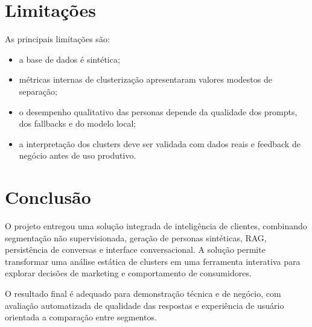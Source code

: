 \documentclass[12pt,a4paper]{article}
\begin{document}
\section{Limitações}

As principais limitações são:

\begin{itemize}
  \item a base de dados é sintética;
  \item métricas internas de clusterização apresentaram valores modestos de separação;
  \item o desempenho qualitativo das personas depende da qualidade dos prompts, dos fallbacks e do modelo local;
  \item a interpretação dos clusters deve ser validada com dados reais e feedback de negócio antes de uso produtivo.
\end{itemize}

\section{Conclusão}

O projeto entregou uma solução integrada de inteligência de clientes, combinando segmentação não supervisionada, geração de personas sintéticas, RAG, persistência de conversas e interface conversacional. A solução permite transformar uma análise estática de clusters em uma ferramenta interativa para explorar decisões de marketing e comportamento de consumidores.

O resultado final é adequado para demonstração técnica e de negócio, com avaliação automatizada de qualidade das respostas e experiência de usuário orientada a comparação entre segmentos.
\end{document}

